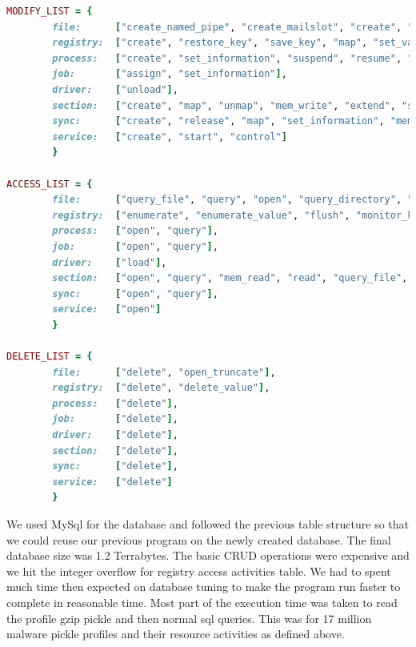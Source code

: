 \begin{lstlisting}[language=ruby,caption={Mapping of WinodowsNT and Windows API call},label={lbl:ntapi}]
MODIFY_LIST = {
        file:      ["create_named_pipe", "create_mailslot", "create", "rename", "lock", "set_information", "write", "unlock", "flush_buffer", "suspend", "map", "resume"],
        registry:  ["create", "restore_key", "save_key", "map", "set_value", "set_information", "compress_key", "lock", "resume", "suspend", "mem_write"],
        process:   ["create", "set_information", "suspend", "resume", "unmap", "map"],
        job:       ["assign", "set_information"],
        driver:    ["unload"],
        section:   ["create", "map", "unmap", "mem_write", "extend", "suspend", "resume", "set_information", "release"],
        sync:      ["create", "release", "map", "set_information", "mem_write"],
        service:   ["create", "start", "control"]
        }

ACCESS_LIST = {
        file:      ["query_file", "query", "open", "query_directory", "query_information", "read", "monitor_dir", "control", "device_control", "fs_control", "query_value"],
        registry:  ["enumerate", "enumerate_value", "flush", "monitor_key", "open", "query", "query_value", "mem_read"],
        process:   ["open", "query"],
        job:       ["open", "query"],
        driver:    ["load"],
        section:   ["open", "query", "mem_read", "read", "query_file", "query_system"],
        sync:      ["open", "query"],
        service:   ["open"]
        }

DELETE_LIST = {
        file:      ["delete", "open_truncate"],
        registry:  ["delete", "delete_value"],
        process:   ["delete"],
        job:       ["delete"],
        driver:    ["delete"],
        section:   ["delete"],
        sync:      ["delete"],
        service:   ["delete"]
        }

\end{lstlisting}
We used MySql for the database and followed the previous table structure so that we could reuse our previous program on the newly created database.
The final database size was 1.2 Terrabytes. The basic CRUD operations were expensive and we hit the integer overflow for registry access activities table. We had to spent much time then expected on database tuning to make the program run faster to complete in reasonable time.
Most part of the execution time was taken to read the profile gzip pickle and then normal sql queries. This was for 17 million malware pickle profiles and their resource activities as defined above.
